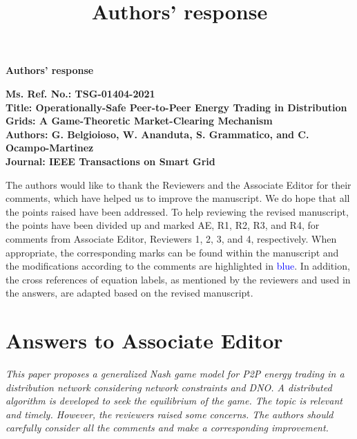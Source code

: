 \documentclass[11pt]{article}
\title{Authors' response}
\date{}
\newcommand{\0}{\mathbf{0}}
\newcommand{\1}{\mathbf{1}}
\newcommand{\query}[2][]{
    \ifthenelse{\equal{#1}{}}{}{\textbf{#1:}~}\emph{#2}\\[0.1em]}
\begin{document}

\begin{center}
\textbf{\Large Authors' response}
\end{center}
\vspace{0.5cm}
\noindent

\textbf{Ms. Ref. No.: TSG-01404-2021}  \\
\textbf{Title: Operationally-Safe Peer-to-Peer Energy Trading in Distribution Grids: A Game-Theoretic Market-Clearing Mechanism}   \\
\textbf{Authors: G. Belgioioso, W. Ananduta, S. Grammatico, and C. Ocampo-Martinez}   \\
\textbf{Journal: IEEE Transactions on Smart Grid}  


\setcounter{page}{1}

The authors would like to thank the Reviewers and the Associate Editor for their comments, which have helped us to improve the manuscript. We do hope that all the points raised have been addressed. {To help reviewing the revised manuscript,} the points have been divided up and marked AE, R1, R2, R3, and R4, for comments from Associate Editor, Reviewers 1, 2, 3, and 4, respectively. When appropriate, the corresponding marks can be found within the manuscript and the modifications according to the comments are highlighted in \textcolor{blue}{blue}. In addition, the cross references of equation labels, as mentioned by the reviewers and used in the answers, are adapted based on the revised manuscript. %


\section*{Answers to Associate Editor}

\query[AE-1]{This paper proposes a generalized Nash game model for P2P energy trading in a distribution network considering network constraints and DNO. A distributed algorithm is developed to seek the equilibrium of the game. The topic is relevant and timely. However, the reviewers raised some concerns. The authors should carefully consider all the comments and make a corresponding improvement. } 
\end{document}
